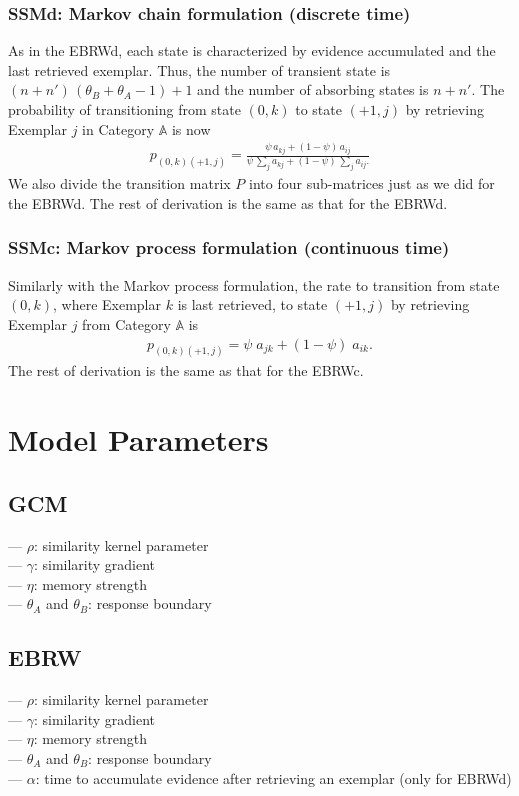 \documentclass[doc]{apa6}
\begin{document}
\subsubsection{SSMd: Markov chain formulation (discrete time)}

As in the EBRWd, each state is characterized by evidence accumulated and the last retrieved
exemplar. Thus, the number of transient state is $(n + n') \, (\theta_{B} + \theta_{A} - 1) + 1$ and
the number of absorbing states is $n + n'$.  The probability of transitioning from state $(0, k)$ to
state $(+1, j)$ by retrieving Exemplar $j$ in Category $\mathbb{A}$ is now
\begin{align}
    p_{(0,k)(+1,j)} = \frac{\psi \, a_{kj} + (1 - \psi) \, a_{ij}}
                           {\psi \, \sum_{j} a_{kj} + (1 - \psi) \, \sum_{j} a_{ij}.}
\end{align}
We also divide the transition matrix $P$ into four sub-matrices just as we did for the EBRWd. The
rest of derivation is the same as that for the EBRWd.


\subsubsection{SSMc: Markov process formulation (continuous time)}

Similarly with the Markov process formulation, the rate to transition from state $(0,k)$, where Exemplar
$k$ is last retrieved, to state $(+1,j)$ by retrieving Exemplar $j$ from Category $\mathbb{A}$ is
\begin{align}
    p_{(0,k)(+1,j)} = \psi \; a_{jk} + (1 - \psi) \; a_{ik}.
\end{align}
The rest of derivation is the same as that for the EBRWc.


\section{Model Parameters}

\subsection{GCM}
\indent --- $\rho$: similarity kernel parameter\\
\indent --- $\gamma$: similarity gradient\\
\indent --- $\eta$: memory strength\\
\indent --- $\theta_{A}$ and $\theta_{B}$: response boundary

\subsection{EBRW}
\indent --- $\rho$: similarity kernel parameter\\
\indent --- $\gamma$: similarity gradient\\
\indent --- $\eta$: memory strength\\
\indent --- $\theta_{A}$ and $\theta_{B}$: response boundary\\
\indent --- $\alpha$: time to accumulate evidence after retrieving an exemplar (only for EBRWd)
\end{document}
